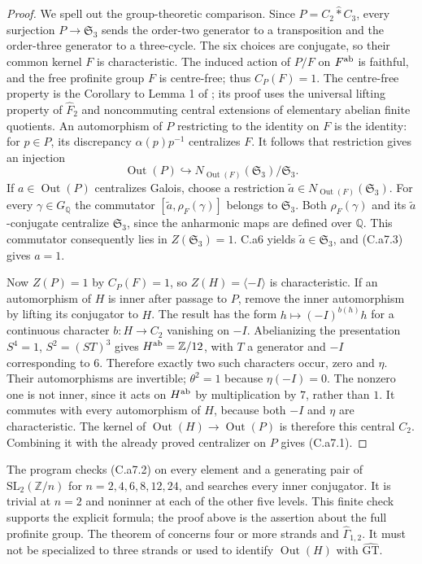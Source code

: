 \begin{proof}
We spell out the group-theoretic comparison. Since
$P=C_2\widehat{*}C_3$, every surjection $P\to\mathfrak S_3$ sends the
order-two generator to a transposition and the order-three generator to
a three-cycle. The six choices are conjugate, so their common kernel
$F$ is characteristic. The induced action of $P/F$ on $F^{\rm ab}$ is
faithful, and the free profinite group $F$ is centre-free; thus
$C_P(F)=1$. The centre-free property is the Corollary to Lemma 1 of
\citet[\S1, pp.~248--249]{Belyi1980arith}; its proof uses the universal
lifting property of $\widehat F_2$ and noncommuting central extensions
of elementary abelian finite quotients.
An automorphism of $P$ restricting to the identity on $F$ is the identity:
for $p\in P$, its discrepancy $\alpha(p)p^{-1}$ centralizes $F$.
It follows that restriction gives an injection
\[
 \operatorname{Out}(P)\hookrightarrow
 N_{\operatorname{Out}(F)}(\mathfrak S_3)/\mathfrak S_3.
 \tag{C.a7.3}
\]
If $a\in\operatorname{Out}(P)$ centralizes Galois, choose a restriction
$\widetilde a\in N_{\operatorname{Out}(F)}(\mathfrak S_3)$. For every
$\gamma\in G_{\mathbb Q}$ the commutator
$[\widetilde a,\rho_F(\gamma)]$ belongs to $\mathfrak S_3$.
Both $\rho_F(\gamma)$ and its $\widetilde a$-conjugate centralize
$\mathfrak S_3$, since the anharmonic maps are defined over $\mathbb Q$.
This commutator consequently lies in $Z(\mathfrak S_3)=1$.
C.a6 yields $\widetilde a\in\mathfrak S_3$, and (C.a7.3) gives $a=1$.

Now $Z(P)=1$ by $C_P(F)=1$, so $Z(H)=\langle-I\rangle$ is
characteristic. If an automorphism of $H$ is inner after passage to $P$,
remove the inner automorphism by lifting its conjugator to $H$. The
result has the form $h\mapsto(-I)^{b(h)}h$ for a continuous character
$b:H\to C_2$ vanishing on $-I$. Abelianizing the presentation
$S^4=1$, $S^2=(ST)^3$ gives $H^{\rm ab}=\mathbb Z/12$, with $T$ a
generator and $-I$ corresponding to $6$. Therefore exactly two such
characters occur, zero and $\eta$. Their automorphisms are invertible;
$\theta^2=1$ because $\eta(-I)=0$. The nonzero one is not inner,
since it acts on $H^{\rm ab}$ by multiplication by $7$, rather than $1$.
It commutes with every automorphism of $H$, because both $-I$ and
$\eta$ are characteristic. The kernel of
$\operatorname{Out}(H)\to\operatorname{Out}(P)$ is therefore this
central $C_2$. Combining it with the already proved centralizer on $P$
gives (C.a7.1).
\end{proof}
The program checks (C.a7.2) on every element and a generating pair of
$\mathrm{SL}_2(\mathbb Z/n)$ for $n=2,4,6,8,12,24$, and searches every
inner conjugator. It is trivial at $n=2$ and noninner at each of the other
five levels. This finite check supports the explicit formula; the proof
above is the assertion about the full profinite group. The theorem of
\citet[Theorem B, Theorem 4.3 and Corollary C]{MN2022arith} concerns
four or more strands and $\widehat\Gamma_{1,2}$. It must not be
specialized to three strands or used to identify
$\operatorname{Out}(H)$ with $\widehat{\mathrm{GT}}$.

